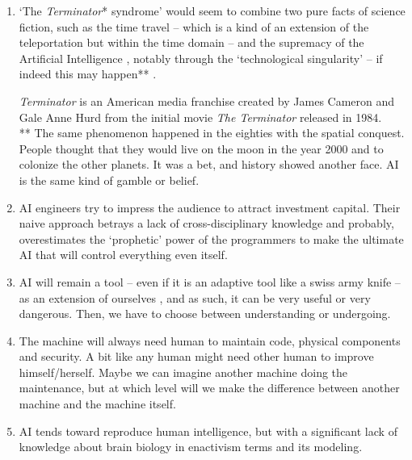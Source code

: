 \documentclass{article}
\begin{document}
\begin{enumerate}[leftmargin=*,label=\underline{\textit{Statement} \arabic*} :]
\item `The \textit{Terminator}*
syndrome' would seem to combine two pure facts of science fiction, such as the time travel -- which is a kind of an extension of the teleportation but within the time domain -- and the supremacy of the Artificial Intelligence%
, notably through the `technological singularity' 
-- if indeed this may happen** \citep{dam}. 
\begin{spacing}{0.8}
{\footnotesize * \textit{Terminator} is an American media franchise created by James Cameron and Gale Anne Hurd from the initial movie \textit{The Terminator} released in 1984. 
\\ ** The same phenomenon happened in the eighties with the spatial conquest. People thought that they would live on the moon in the year 2000 and to colonize the other planets. It was a bet, and history showed another face. AI is the same kind of gamble or belief.}%
\end{spacing}
\vspace{1mm}
\item AI engineers try to impress the audience to attract investment capital. 
Their naive approach betrays a lack of cross-disciplinary knowledge and probably, 
overestimates the `prophetic' power of the programmers to make the ultimate AI that will control everything even itself. %
\item AI will remain a tool  -- even if it is an adaptive tool like a swiss army knife -- as an extension of ourselves \citep{mm}, and as such, it can be very useful or very dangerous. Then, we have to choose between understanding or undergoing.
\item The machine will always need human to maintain code, physical components and security. A bit like any human might need other human to improve himself/herself. Maybe we can imagine another machine doing the maintenance, but at which level will we make the difference between another machine and the machine itself.
\item AI tends toward reproduce human intelligence, but with a significant lack of knowledge about brain biology in enactivism terms and its modeling.

\end{enumerate}
\end{document}
